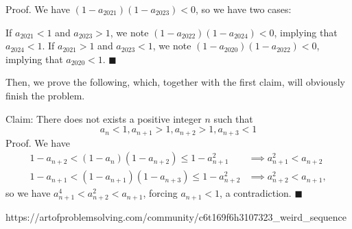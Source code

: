 \documentclass[a4paper]{article}
\begin{document}
\begin{question}[c]{}
{Proof. We have $(1-a_{2021})(1-a_{2023}) < 0$, so we have two cases:

    If $a_{2021} < 1$ and $a_{2023}>1$, we note $(1-a_{2022})(1-a_{2024}) < 0$, implying that $a_{2024}<1$.
    If $a_{2021} > 1$ and $a_{2023}<1$, we note $(1-a_{2020})(1-a_{2022}) < 0$, implying that $a_{2020} < 1$. $\blacksquare$


Then, we prove the following, which, together with the first claim, will obviously finish the problem.

Claim: There does not exists a positive integer $n$ such that
$$a_n < 1, a_{n+1} > 1, a_{n+2}>1, a_{n+3}<1$$Proof. We have
\begin{align*} 1-a_{n+2} < (1-a_n)(1-a_{n+2}) \leq 1-a_{n+1}^2 &\implies a_{n+1}^2 < a_{n+2} \\ 1-a_{n+1} < (1-a_{n+1})(1-a_{n+3}) \leq 1-a_{n+2}^2 &\implies a_{n+2}^2 < a_{n+1}, \end{align*}so we have $a_{n+1}^4 < a_{n+2}^2 < a_{n+1}$, forcing $a_{n+1}<1$, a contradiction. $\blacksquare$
    }{%
    https://artofproblemsolving.com/community/c6t169f6h3107323_weird_sequence
  }
\end{question}
\end{document}
